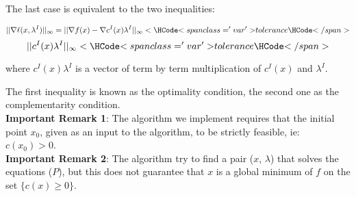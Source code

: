\begin{itemize}
  The last case is equivalent to the two inequalities:

  $$ || \nabla \ell(x,\lambda^I)||_{\infty} = ||\nabla f(x) - \nabla c^I(x) \lambda^I ||_{\infty} < \var{tolerance} $$
  $$ || c^I(x) \lambda^I ||_{\infty} < \var{tolerance} $$

  where $c^I(x) \lambda^I$ is a vector of term by term multiplication of $c^I(x)$ and $\lambda^I$.

  The first inequality is known as the optimality condition, the second one as the complementarity condition.\\

  \textbf{Important Remark 1}: The algorithm we implement requires that the initial point $x_0$, given as an input to the algorithm, to be strictly feasible, ie: $c(x_0)>0$.\\
  \textbf{Important Remark 2}: The algorithm try to find a pair ($x$, $\lambda$) that solves the equations ($P$), but this does not guarantee that $x$ is a global minimum of $f$ on the set $\{c(x)\geq0\}$.

\end{itemize}

